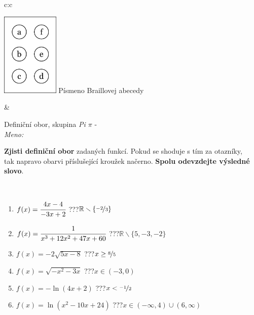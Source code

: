 \documentclass[10pt]{report}
\begin{document}
\begin{tabular}{c:c}
\begin{minipage}[c][104.5mm][t]{0.5\linewidth}
\begin{center}
\begin{minipage}{0.20\linewidth}
\begin{center}
\includegraphics[height=40mm]{../images/braille.png}
{\small Písmeno Braillovej abecedy}
\end{center}
\end{minipage}
\end{center}
\end{minipage}
&
\begin{minipage}[c][104.5mm][t]{0.5\linewidth}
\begin{center}
\vspace{7mm}
{\huge Definiční obor, skupina \textit{Pi $\pi$} -}\\[5mm]
\textit{Meno:}\phantom{xxxxxxxxxxxxxxxxxxxxxxxxxxxxxxxxxxxxxxxxxxxxxxxxxxxxxxxxxxxxxxxxx}\\[5mm]
\begin{minipage}{0.95\linewidth}
\textbf{Zjisti definiční obor} zadaných funkcí. Pokud se shoduje s tím za otazníky,\\tak napravo obarvi příslušející kroužek načerno. \textbf{Spolu odevzdejte výsledné slovo}.
\end{minipage}
\\[1mm]
\begin{minipage}{0.79\linewidth}
\begin{center}
\begin{varwidth}{\linewidth}
\begin{enumerate}
\normalsizerrr
\item $f(x)=\cfrac{4x-4}{-3x+2}$\quad \dotfill\; ???\;\dotfill \quad $\mathbb{R}\smallsetminus\{\nicefrac{-2}{3}\}$
\item $f(x)=\cfrac{1}{x^3+12x^2+47x+60}$\quad \dotfill\; ???\;\dotfill \quad $\mathbb{R}\smallsetminus\{5,-3,-2\}$
\item $f(x)=-2\sqrt{5x-8}$\quad \dotfill\; ???\;\dotfill \quad $x\geq\nicefrac{8}{5}$
\item $f(x)=\sqrt{-x^2-3x}$\quad \dotfill\; ???\;\dotfill \quad $x\in(-3 , 0)$
\item $f(x)=-\ln{(4x+2)}$\quad \dotfill\; ???\;\dotfill \quad $x<\nicefrac{-1}{2}$
\item $f(x)=\ln{(x^2-10x+24)}$\quad \dotfill\; ???\;\dotfill \quad $x\in(-\infty , 4)\cup(6 , \infty)$

\end{enumerate}
\end{varwidth}
\end{center}
\end{minipage}
\end{center}
\end{minipage}
\end{tabular}
\end{document}
